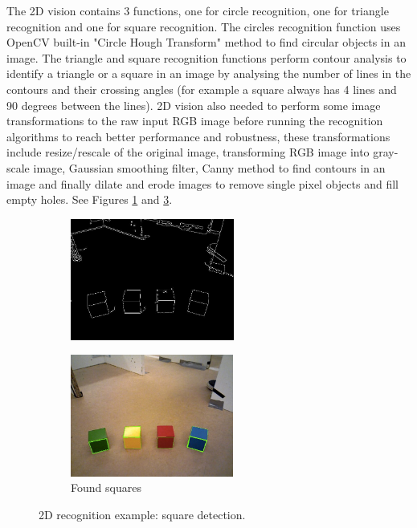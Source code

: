 The 2D vision contains 3 functions, one for circle recognition, one for triangle recognition and one for square recognition. The circles recognition function uses OpenCV built-in "Circle Hough Transform" method to find circular objects in an image. The triangle  and square recognition functions perform contour analysis to identify a triangle or a square in an image by analysing the number of lines in the contours and their crossing angles (for example a square always has 4 lines and 90 degrees between the lines). 2D vision also needed to perform some image transformations to the raw input RGB image before running the recognition algorithms to reach better performance and robustness, these transformations include resize/rescale of the original image, transforming RGB image into gray-scale image, Gaussian smoothing filter, Canny method to find contours in an image and finally dilate and erode images to remove single pixel objects and fill empty holes. See Figures \ref{fig:ryan1} and \ref{fig:ryan2}.

\begin{figure}[h]
        \centering
        \begin{subfigure}[b]{0.4\linewidth}
                \includegraphics[height=4cm]{figures/canny.jpg}
                \label{fig:ryan1}
        \end{subfigure}
        \begin{subfigure}[b]{0.4\linewidth}
                \includegraphics[height=4cm]{figures/squares.jpg}
                \caption{Found squares}
                \label{fig:ryan2}
        \end{subfigure}
        \caption{2D recognition example: square detection.}
\end{figure}


